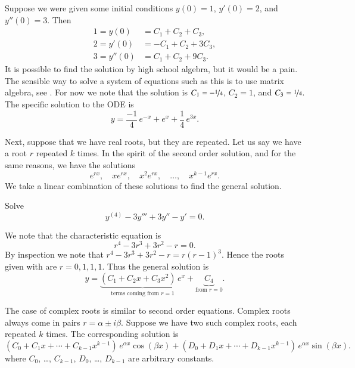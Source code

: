 \documentclass[12pt]{book}
\begin{document}
\begin{example}
Suppose we were given some initial conditions $y(0) = 1$, $y'(0) = 2$,
and $y''(0) = 3$.  Then
\begin{align*}
1 = y(0) & = C_1 + C_2 + C_3 , \\
2 = y'(0) & = -C_1 + C_2 + 3C_3 , \\
3 = y''(0) & = C_1 + C_2 + 9C_3 .
\end{align*}
It is possible to find the solution by high school algebra, but it would be a
pain.
The sensible way to solve a system of equations such as this is to use
matrix algebra, see
.  For now we note that the solution is $C_1 =
-\nicefrac{1}{4}$,
$C_2 = 1$, and $C_3 = \nicefrac{1}{4}$.  The specific solution
to the ODE is
\begin{equation*}
y = \frac{-1}{4}\, e^{-x} + e^x + \frac{1}{4}\, e^{3x} .
\end{equation*}
\end{example}

Next, suppose that we have real roots, but they are repeated.  Let us say
we have
a root $r$ repeated $k$ times.  In the spirit of the second
order solution, and for the same reasons, we have the solutions
\begin{equation*}
e^{rx}, \quad xe^{rx}, \quad x^2 e^{rx}, \quad \ldots, \quad x^{k-1} e^{rx} .
\end{equation*}
We take a linear combination of these solutions to find the general
solution.

\begin{example}
Solve
\begin{equation*}
y^{(4)} - 3 y''' + 3 y'' - y' =  0 .
\end{equation*}

We note that the characteristic equation is
\begin{equation*}
r^4 - 3r^3 + 3r^2 -r = 0 .
\end{equation*}
By inspection we note that $r^4 - 3r^3 + 3r^2 -r = r{(r-1)}^3$.  Hence
the roots given with  are $r = 0, 1, 1, 1$.  Thus the general
solution is
\begin{equation*}
y = \underbrace{(C_1 + C_2 x + C_3 x^2)\, e^x}_{\text{terms coming from }
r=1} + \underbrace{C_4}_{\text{from } r=0} .
\end{equation*}
\end{example}

The case of complex roots is similar
to second order equations.
Complex roots
always come in pairs $r = \alpha \pm i \beta$.  Suppose we have
two such complex roots, each repeated $k$ times.
The corresponding solution is
\begin{equation*}
( C_0 + C_1 x + \cdots + C_{k-1} x^{k-1} ) \, e^{\alpha x} \cos (\beta x)
+
( D_0 + D_1 x + \cdots + D_{k-1} x^{k-1} ) \, e^{\alpha x} \sin (\beta x) .
\end{equation*}
where $C_0$, \ldots, $C_{k-1}$, $D_0$, \ldots, $D_{k-1}$ are arbitrary
constants.
\end{document}
